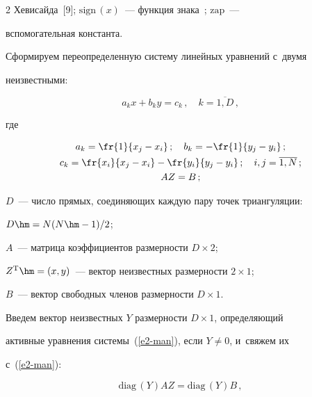 \begin{multicols}{2}
Хевисайда~[9]; $\mathrm{sign}\,(x)$~--- функция знака~\cite{10-man}; $\mathrm{zap}$~--- 


вспомогательная константа.


  


  Сформируем переопределенную сис\-те\-му линейных урав\-не\-ний с~двумя 


неизвестными:


  \begin{equation}


    a_k x +b_k y=c_k\,,\quad


k=\overline{1,D}\,,


  \label{e2-man}


\end{equation}


где


\begin{gather*}


  a_k=\fr{1}{x_j-x_i}\,;\quad b_k=-\fr{1}{y_j-y_i}\,;\\


   c_k=\fr{x_i}{x_j-x_i}-  \fr{y_i}{y_j-y_i}\,;\quad i,j=\overline{1,N}\,;\\


  A Z =B\,;


    \end{gather*}


$D$~--- чис\-ло прямых, соединяющих каждую пару точек триангуляции:


$D\hm={N(N\hm-1)}/{2}$;


$A$~--- матрица коэффициентов размерности $D\times 2$;


$Z^{\mathrm{T}}\hm=(x,y)$~--- вектор неизвестных раз\-мер\-ности $2\times 1$;


$B$~--- вектор свободных членов раз\-мер\-ности $D\times 1$.





  Введем вектор неизвестных $Y$ размерности $D\times 1$, опре\-де\-ля\-ющий 


активные урав\-не\-ния сис\-те\-мы~(\ref{e2-man}), если $Y\not= 0$, и~свяжем их 


с~(\ref{e2-man}):


  \begin{equation}


  \mathrm{diag}\,(Y) AZ=\mathrm{diag}\,(Y)B\,,


  \label{e3-man}


  \end{equation}



\end{multicols}
